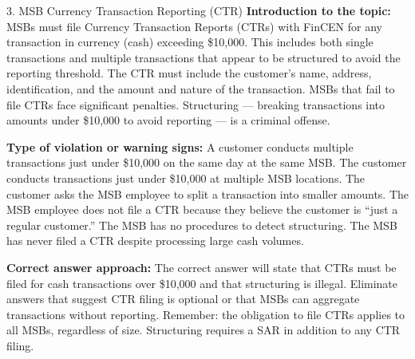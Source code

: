 \documentclass[11pt,a4paper]{beamer}
\begin{document}
\begin{frame}{3. MSB Currency Transaction Reporting (CTR)}
\tiny
\noindent\textbf{Introduction to the topic:} MSBs must file Currency Transaction Reports (CTRs) with FinCEN for any transaction in currency (cash) exceeding \$10,000. This includes both single transactions and multiple transactions that appear to be structured to avoid the reporting threshold. The CTR must include the customer's name, address, identification, and the amount and nature of the transaction. MSBs that fail to file CTRs face significant penalties. Structuring — breaking transactions into amounts under \$10,000 to avoid reporting — is a criminal offense.

\vspace{0.1cm}
\noindent\textbf{Type of violation or warning signs:} A customer conducts multiple transactions just under \$10,000 on the same day at the same MSB. The customer conducts transactions just under \$10,000 at multiple MSB locations. The customer asks the MSB employee to split a transaction into smaller amounts. The MSB employee does not file a CTR because they believe the customer is “just a regular customer.” The MSB has no procedures to detect structuring. The MSB has never filed a CTR despite processing large cash volumes.

\vspace{0.1cm}
\noindent\textbf{Correct answer approach:} The correct answer will state that CTRs must be filed for cash transactions over \$10,000 and that structuring is illegal. Eliminate answers that suggest CTR filing is optional or that MSBs can aggregate transactions without reporting. Remember: the obligation to file CTRs applies to all MSBs, regardless of size. Structuring requires a SAR in addition to any CTR filing.
\end{frame}
\end{document}
